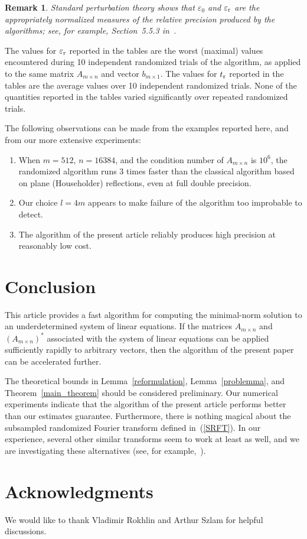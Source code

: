 \documentclass[letterpaper,12pt]{article}
\def\epsilon{\varepsilon}
\newtheorem{remark1}[theorem]{Remark}
\newenvironment{remark}{\begin{remark1} \rm}{\end{remark1}}
\begin{document}
\begin{remark}
Standard perturbation theory shows that
$\epsilon_0$ and $\epsilon_{\rm r}$ are the appropriately normalized measures
of the relative precision produced by the algorithms;
see, for example, Section~5.5.3 in~\cite{dahlquist-bjorck}.
\end{remark}

The values for $\epsilon_{\rm r}$ reported in the tables are
the worst (maximal) values encountered during 10 independent randomized trials
of the algorithm, as applied to the same matrix $A_{m \times n}$
and vector $b_{m \times 1}$.
The values for $t_{\rm r}$ reported in the tables are the average values
over 10 independent randomized trials.
None of the quantities reported in the tables varied significantly
over repeated randomized trials.

The following observations can be made from the examples reported here,
and from our more extensive experiments:

\begin{enumerate}
\item When $m = 512$, $n = 16384$,
and the condition number of $A_{m \times n}$ is $10^6$,
the randomized algorithm runs 3 times faster than the classical algorithm
based on plane (Householder) reflections, even at full double precision.
\item Our choice $l = 4m$ appears to make failure of the algorithm
too improbable to detect.
\item The algorithm of the present article reliably produces high precision
at reasonably low cost.
\end{enumerate}



\section{Conclusion}
\label{conclusions}

This article provides a fast algorithm for computing the minimal-norm solution
to an underdetermined system of linear equations.
If the matrices $A_{m \times n}$ and $(A_{m \times n})^*$
associated with the system of linear equations
can be applied sufficiently rapidly to arbitrary vectors, then the algorithm
of the present paper can be accelerated further.

The theoretical bounds in Lemma~\ref{reformulation}, Lemma~\ref{problemma},
and Theorem~\ref{main_theorem} should be considered preliminary.
Our numerical experiments indicate that the algorithm
of the present article performs better than our estimates guarantee.
Furthermore, there is nothing magical
about the subsampled randomized Fourier transform defined in~(\ref{SRFT}).
In our experience, several other similar transforms seem
to work at least as well, and we are investigating these alternatives
(see, for example,~\cite{ailon-liberty}).



\section*{Acknowledgments}
We would like to thank Vladimir Rokhlin and Arthur Szlam
for helpful discussions.



\newpage




\end{document}
